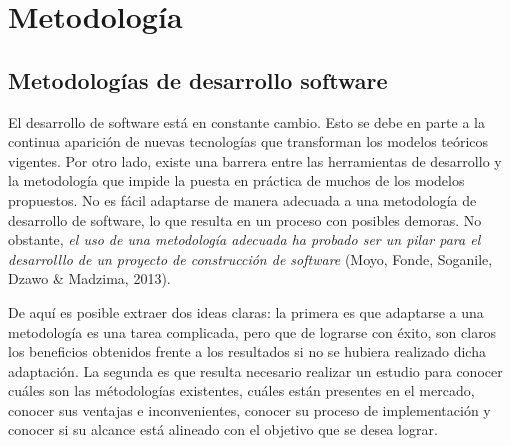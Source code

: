 

\section{Metodología}
\subsection{Metodologías de desarrollo software}
El desarrollo de software está en constante cambio. Esto se debe en parte a la continua aparición de nuevas tecnologías que 
transforman los modelos teóricos vigentes. Por otro lado, existe una barrera entre las herramientas de desarrollo y la 
metodología que impide la puesta en práctica de muchos de los modelos propuestos. No es fácil adaptarse de manera adecuada 
a una metodología de desarrollo de software, lo que resulta en un proceso con posibles demoras. No obstante, 
\textit{el uso de una metodología adecuada ha probado ser un pilar para el desarrolllo de un proyecto de construcción de software} 
(Moyo, Fonde, Soganile, Dzawo \& Madzima, 2013). \medskip


De aquí es posible extraer dos ideas claras: la primera es que adaptarse a una metodología es una tarea complicada, 
pero que de lograrse con éxito, son claros los beneficios obtenidos frente a los resultados si no se hubiera 
realizado dicha adaptación. La segunda es que resulta necesario realizar un estudio para conocer 
cuáles son las métodologías existentes, cuáles están presentes en el mercado, conocer sus ventajas e inconvenientes, 
conocer su proceso de implementación y conocer si su alcance está alineado con el objetivo que se desea lograr. \medskip

